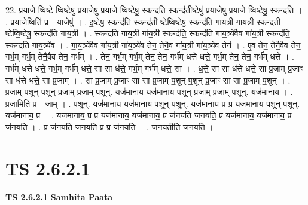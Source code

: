 \documentclass[17pt]{extarticle}
\begin{document}
22. प्र॒या॒जे ष्वि॒ष्टे ष्वि॒ष्टेषु॑ प्रया॒जेषु॑ प्रया॒जे ष्वि॒ष्टेषु॒ स्कन्द॑ति॒ स्कन्द॑ती॒ष्टेषु॑ प्रया॒जेषु॑ प्रया॒जे ष्वि॒ष्टेषु॒ स्कन्द॑ति । . प्र॒या॒जेष्विति॑ प्र - या॒जेषु॑ । . इ॒ष्टेषु॒ स्कन्द॑ति॒ स्कन्द॑ती॒ ष्टेष्वि॒ष्टेषु॒ स्कन्द॑ति गाय॒त्री गा॑य॒त्री स्कन्द॑ती॒ ष्टेष्वि॒ष्टेषु॒ स्कन्द॑ति गाय॒त्री । . स्कन्द॑ति गाय॒त्री गा॑य॒त्री स्कन्द॑ति॒ स्कन्द॑ति गाय॒त्र्ये॑वैव गा॑य॒त्री स्कन्द॑ति॒ स्कन्द॑ति गाय॒त्र्ये॑व । . गा॒य॒त्र्ये॑वैव गा॑य॒त्री गा॑य॒त्र्ये॑व तेन॒ तेनै॒व गा॑य॒त्री गा॑य॒त्र्ये॑व तेन॑ । . ए॒व तेन॒ तेनै॒वैव तेन॒ गर्भ॒म् गर्भ॒म् तेनै॒वैव तेन॒ गर्भ᳚म् । . तेन॒ गर्भ॒म् गर्भ॒म् तेन॒ तेन॒ गर्भ॑म् धत्ते धत्ते॒ गर्भ॒म् तेन॒ तेन॒ गर्भ॑म् धत्ते । . गर्भ॑म् धत्ते धत्ते॒ गर्भ॒म् गर्भ॑म् धत्ते॒ सा सा ध॑त्ते॒ गर्भ॒म् गर्भ॑म् धत्ते॒ सा । . ध॒त्ते॒ सा सा ध॑त्ते धत्ते॒ सा प्र॒जाम् प्र॒जाꣳ सा ध॑त्ते धत्ते॒ सा प्र॒जाम् । . सा प्र॒जाम् प्र॒जाꣳ सा सा प्र॒जाम् प॒शून् प॒शून् प्र॒जाꣳ सा सा प्र॒जाम् प॒शून् । . प्र॒जाम् प॒शून् प॒शून् प्र॒जाम् प्र॒जाम् प॒शून्. यज॑मानाय॒ यज॑मानाय प॒शून् प्र॒जाम् प्र॒जाम् प॒शून्. यज॑मानाय । . प्र॒जामिति॑ प्र - जाम् । . प॒शून्. यज॑मानाय॒ यज॑मानाय प॒शून् प॒शून्. यज॑मानाय॒ प्र प्र यज॑मानाय प॒शून् प॒शून्. यज॑मानाय॒ प्र । . यज॑मानाय॒ प्र प्र यज॑मानाय॒ यज॑मानाय॒ प्र ज॑नयति जनयति॒ प्र यज॑मानाय॒ यज॑मानाय॒ प्र ज॑नयति । . प्र ज॑नयति जनयति॒ प्र प्र ज॑नयति । . ज॒न॒य॒तीति॑ जनयति । \newline
\pagebreak
{}

\section{ TS 2.6.2.1 }

\textbf{TS 2.6.2.1 } \newline
\textbf{Samhita Paata} \newline
\end{document}
